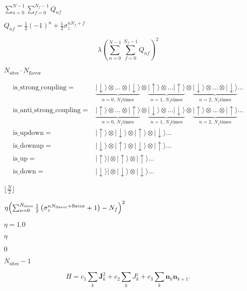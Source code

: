 \documentclass{article}
\begin{document}
{$ \sum_{n=0}^{N-1} \sum_{f=0}^{N_f-1} Q_{nf} $
\pagebreak

$ Q_{nf} = \frac{1}{2}\left(-1\right)^n+\frac{1}{2}\sigma_z^{nN_f+f} $
\pagebreak

\[ \lambda\left(\sum_{n=0}^{N-1} \sum_{f=0}^{N_f-1} Q_{nf}\right)^2 \]
\pagebreak

$ N_\mathrm{sites}\cdot N_\mathrm{flavor} $
\pagebreak

\begin{eqnarray*} \mathrm{is\_strong\_coupling} =& \underbrace{|\downarrow\rangle \otimes \dots \otimes|\downarrow\rangle}_{n=0,\,N_f \mathrm{ times}} \otimes \underbrace{|\uparrow\rangle \otimes \dots |\uparrow\rangle}_{n=1,\,N_f \mathrm{ times}}\otimes \underbrace{|\downarrow\rangle \otimes \dots \otimes|\downarrow\rangle}_{n=2,\,N_f \mathrm{ times}} \dots \\ \mathrm{is\_anti\_strong\_coupling} =& \underbrace{|\uparrow\rangle \otimes \dots \otimes|\uparrow\rangle}_{n=0,\,N_f \mathrm{ times}} \otimes \underbrace{|\downarrow\rangle \otimes \dots |\downarrow\rangle}_{n=1,\,N_f \mathrm{ times}}\otimes \underbrace{|\uparrow\rangle \otimes \dots \otimes|\uparrow\rangle}_{n=2,\,N_f \mathrm{ times}} \dots \\ \mathrm{is\_updown} =& |\uparrow\rangle \otimes |\downarrow\rangle \otimes |\uparrow\rangle \otimes |\downarrow\rangle \dots \\ \mathrm{is\_downup} =& |\downarrow\rangle \otimes |\uparrow\rangle \otimes |\downarrow\rangle \otimes |\uparrow\rangle \dots \\ \mathrm{is\_up} =& |\uparrow\rangle|\otimes |\uparrow\rangle \otimes |\uparrow\rangle \dots \\ \mathrm{is\_down} =& |\downarrow\rangle|\otimes |\downarrow\rangle \otimes|\downarrow\rangle \dots \end{eqnarray*}
\pagebreak

$ \lfloor\frac{N}{2}\rfloor $
\pagebreak

$ \eta \Bigl(\sum_{n=0}^{N_\mathrm{sites}}\frac{1}{2}\left(\sigma_z^{nN_\mathrm{flavor}+\mathrm{flavor}}+1\right) - N_f\Bigr)^2 $
\pagebreak

$ \eta=1.0 $
\pagebreak

$ \eta $
\pagebreak

$ 0 $
\pagebreak

$ N_\mathrm{sites} - 1$
\pagebreak

\[ H = c_1 \sum_k \mathbf{J}^2_k + c_2\sum_k J^z_k + c_3\sum_k \mathbf{n}_k \mathbf{n}_{k+1}. \]
\pagebreak

}
\end{document}
